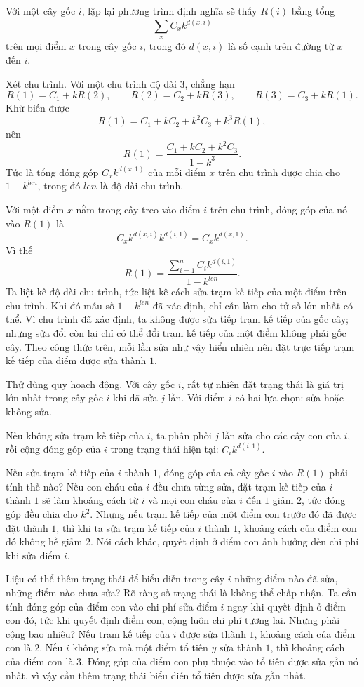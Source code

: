 \documentclass[11pt]{article}
\begin{document}
Với một cây gốc $i$, lặp lại phương trình định nghĩa sẽ thấy $R(i)$ bằng tổng
\[
  \sum_x C_x k^{d(x,i)}
\]
trên mọi điểm $x$ trong cây gốc $i$, trong đó $d(x,i)$ là số cạnh trên đường
từ $x$ đến $i$.

Xét chu trình. Với một chu trình độ dài $3$, chẳng hạn
\[
  R(1)=C_1+kR(2),\qquad
  R(2)=C_2+kR(3),\qquad
  R(3)=C_3+kR(1).
\]
Khử biến được
\[
  R(1)=C_1+kC_2+k^2C_3+k^3R(1),
\]
nên
\[
  R(1)=\frac{C_1+kC_2+k^2C_3}{1-k^3}.
\]
Tức là tổng đóng góp $C_x k^{d(x,1)}$ của mỗi điểm $x$ trên chu trình được
chia cho $1-k^{\mathit{len}}$, trong đó \(\mathit{len}\) là độ dài chu trình.

Với một điểm $x$ nằm trong cây treo vào điểm $i$ trên chu trình, đóng góp của
nó vào $R(1)$ là
\[
  C_x k^{d(x,i)} k^{d(i,1)} = C_x k^{d(x,1)}.
\]
Vì thế
\[
  R(1)=
  \frac{\sum_{i=1}^{n} C_i k^{d(i,1)}}{1-k^{\mathit{len}}}.
\]
Ta liệt kê độ dài chu trình, tức liệt kê cách sửa trạm kế tiếp của một điểm
trên chu trình. Khi đó mẫu số $1-k^{\mathit{len}}$ đã xác định, chỉ cần làm
cho tử số lớn nhất có thể. Vì chu trình đã xác định, ta không được sửa tiếp
trạm kế tiếp của gốc cây; những sửa đổi còn lại chỉ có thể đổi trạm kế tiếp
của một điểm không phải gốc cây. Theo công thức trên, mỗi lần sửa như vậy hiển
nhiên nên đặt trực tiếp trạm kế tiếp của điểm được sửa thành $1$.

Thử dùng quy hoạch động. Với cây gốc $i$, rất tự nhiên đặt trạng thái là giá
trị lớn nhất trong cây gốc $i$ khi đã sửa $j$ lần. Với điểm $i$ có hai lựa
chọn: sửa hoặc không sửa.

Nếu không sửa trạm kế tiếp của $i$, ta phân phối $j$ lần sửa cho các cây con
của $i$, rồi cộng đóng góp của $i$ trong trạng thái hiện tại:
$C_i k^{d(i,1)}$.

Nếu sửa trạm kế tiếp của $i$ thành $1$, đóng góp của cả cây gốc $i$ vào
$R(1)$ phải tính thế nào? Nếu con cháu của $i$ đều chưa từng sửa, đặt trạm kế
tiếp của $i$ thành $1$ sẽ làm khoảng cách từ $i$ và mọi con cháu của $i$ đến
$1$ giảm $2$, tức đóng góp đều chia cho $k^2$. Nhưng nếu trạm kế tiếp của một
điểm con trước đó đã được đặt thành $1$, thì khi ta sửa trạm kế tiếp của $i$
thành $1$, khoảng cách của điểm con đó không hề giảm $2$. Nói cách khác, quyết
định ở điểm con ảnh hưởng đến chi phí khi sửa điểm $i$.

Liệu có thể thêm trạng thái để biểu diễn trong cây $i$ những điểm nào đã sửa,
những điểm nào chưa sửa? Rõ ràng số trạng thái là không thể chấp nhận. Ta cần
tính đóng góp của điểm con vào chi phí sửa điểm $i$ ngay khi quyết định ở điểm
con đó, tức khi quyết định điểm con, cộng luôn chi phí tương lai. Nhưng phải
cộng bao nhiêu? Nếu trạm kế tiếp của $i$ được sửa thành $1$, khoảng cách của
điểm con là $2$. Nếu $i$ không sửa mà một điểm tổ tiên $y$ sửa thành $1$, thì
khoảng cách của điểm con là $3$. Đóng góp của điểm con phụ thuộc vào tổ tiên
được sửa gần nó nhất, vì vậy cần thêm trạng thái biểu diễn tổ tiên được sửa
gần nhất.
\end{document}
